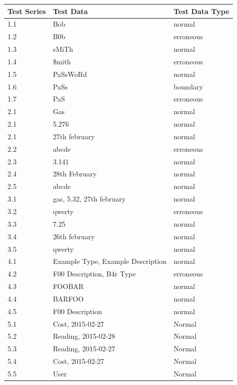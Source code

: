\begin{center}
\begin{tabular}{|p{1.5cm}|p{2cm}|p{2cm}|}
	\hline
	\textbf{Test Series} & \textbf{Test Data}& \textbf{Test Data Type} \\ \hline
	1.1 & Bob & normal \\ \hline
	1.2 & B0b & erroneous\\ \hline
	1.3 & sMiTh & normal\\ \hline
	1.4 & \$mith & erroneous\\ \hline
	1.5 & PaSsWoRd & normal \\ \hline
	1.6 & PaSs & boundary \\ \hline
	1.7 & PaS & erroneous \\ \hline
	2.1 & Gas & normal \\ \hline
	2.1 & 5.276 & normal \\ \hline
	2.1 & 27th february & normal \\ \hline
	2.2 & abcde & erroneous \\ \hline
	2.3 & 3.141 & normal \\ \hline
	2.4 & 28th February & normal \\ \hline
	2.5 & abcde & normal \\ \hline
	3.1 & gas, 5.32, 27th february & normal \\ \hline
	3.2 & qwerty & erroneous \\ \hline
	3.3 & 7.25 & normal \\ \hline
	3.4 & 26th february & normal \\ \hline
	3.5 & qwerty & normal \\ \hline
	4.1 & Example Type, Example Description & normal \\ \hline
	4.2 & F00 Description, B4r Type & erroneous \\ \hline
	4.3 & FOOBAR & normal \\ \hline
	4.4 & BARFOO & normal \\ \hline
	4.5 & F00 Description & normal \\ \hline
	5.1 & Cost, 2015-02-27 & Normal \\ \hline
	5.2 & Reading, 2015-02-28 & Normal \\ \hline
	5.3 & Reading, 2015-02-27 & Normal \\  \hline
	5.4 & Cost, 2015-02-27 & Normal \\ \hline
	5.5 & User & Normal \\ \hline
\end{tabular}
\end{center}
	
